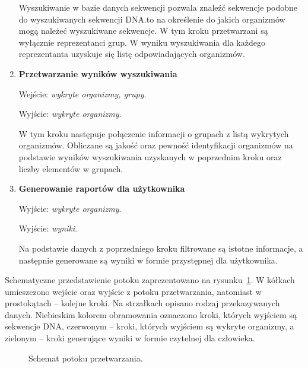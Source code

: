 \begin{enumerate}
{                    Wyszukiwanie w bazie danych sekwencji pozwala znaleźć sekwencje podobne do wyszukiwanych sekwencji DNA.\@Pozwala to na określenie do jakich organizmów mogą należeć wyszukiwane sekwencje. W tym kroku przetwarzani są wyłącznie reprezentanci grup. W wyniku wyszukiwania dla każdego reprezentanta uzyskuje się listę odpowiadających organizmów.
                }
                \item {
                    \textbf{Przetwarzanie wyników wyszukiwania}

                    Wejście: \textit{wykryte organizmy, grupy}.

                    Wyjście: \textit{wykryte organizmy}.

                    W tym kroku następuje połączenie informacji o grupach z listą wykrytych organizmów. Obliczane są jakość oraz pewność identyfikacji organizmów na podstawie wyników wyszukiwania uzyskanych w poprzednim kroku oraz liczby elementów w grupach.
                }
                \item {
                    \textbf{Generowanie raportów dla użytkownika}

                    Wyjście: \textit{wykryte organizmy}.

                    Wyjście: \textit{wyniki}.

                    Na podstawie danych z poprzedniego kroku filtrowane są istotne informacje, a następnie generowane są wyniki w formie przystępnej dla użytkownika.
                }
            \end{enumerate}

            Schematyczne przedstawienie potoku zaprezentowano na rysunku~\ref{Picture:Pipeline}. W kółkach umieszczono wejście oraz wyjście z potoku przetwarzania, natomiast w prostokątach – kolejne kroki. Na strzałkach opisano rodzaj przekazywanych danych. Niebieskim kolorem obramowania oznaczono kroki, których wyjściem są sekwencje DNA, czerwonym – kroki, których wyjściem są wykryte organizmy, a zielonym – kroki generujące wyniki w formie czytelnej dla człowieka.

            \begin{figure}
                \begin{center}
                    
                \end{center}
                \caption{
                    Schemat potoku przetwarzania.
                }\label{Picture:Pipeline}
            \end{figure}

